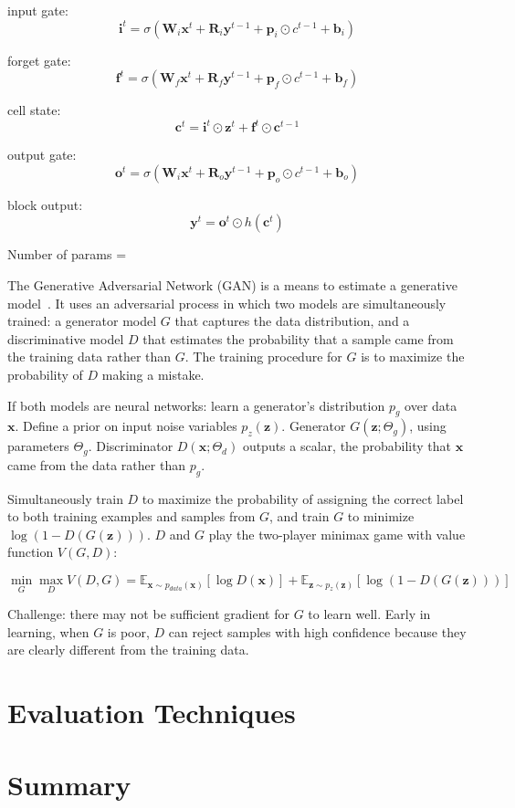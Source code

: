 input gate:
\[ \bm{i}^{t} = \sigma \left( \bm{W}_i \bm{x}^t + \bm{R}_i \bm{y}^{t-1} + \bm{p}_i \odot c^{t-1} + \bm{b}_i \right) \]

forget gate:
\[ \bm{f}^{t} = \sigma \left( \bm{W}_f \bm{x}^t + \bm{R}_f \bm{y}^{t-1} + \bm{p}_f \odot c^{t-1} + \bm{b}_f \right) \]

cell state:
\[ \bm{c}^t = \bm{i}^t \odot \bm{z}^t + \bm{f}^t \odot \bm{c}^{t-1} \]

output gate:
\[ \bm{o}^{t} = \sigma \left( \bm{W}_i \bm{x}^t + \bm{R}_o \bm{y}^{t - 1} + \bm{p}_o \odot c^{t-1} + \bm{b}_o \right) \]

block output:
\[ \bm{y}^t = \bm{o}^t \odot h(\bm{c}^t) \]

Number of params = \todo[inline]{\ldots}



The Generative Adversarial Network (GAN) is a means to estimate a generative model~\cite{Goodfellow2014}. It uses an adversarial process in which two models are simultaneously trained: a generator model $G$ that captures the data distribution, and a discriminative model $D$ that estimates the probability that a sample came from the training data rather than $G$. The training procedure for $G$ is to maximize the probability of $D$ making a mistake.

If both models are neural networks: learn a generator's distribution $p_g$ over data $\bm{x}$. Define a prior on input noise variables $p_z(\bm{z})$. Generator $G(\bm{z}; \Theta_g)$, using parameters $\Theta_g$. Discriminator $D(\bm{x}; \Theta_d)$ outputs a scalar, the probability that $\bm{x}$ came from the data rather than $p_g$. 

Simultaneously train $D$ to maximize the probability of assigning the correct label to both training examples and samples from $G$, and train $G$ to minimize $\log (1 - D(G(\bm{z})))$. $D$ and $G$ play the two-player minimax game with value function $V(G, D)$:

\[ \min_G \max_D V(D, G) = \mathbb{E}_{\bm{x} \sim  p_{data}(\bm{x})} [ \log D(\bm{x}) ] + \mathbb{E}_{\bm{z} \sim p_z(\bm{z})} [ \log (1 - D(G(\bm{z}))) ] \]

Challenge: there may not be sufficient gradient for $G$ to learn well. Early in learning, when $G$ is poor, $D$ can reject samples with high confidence because they are clearly different from the training data.

\section{Evaluation Techniques}

\section{Summary}
